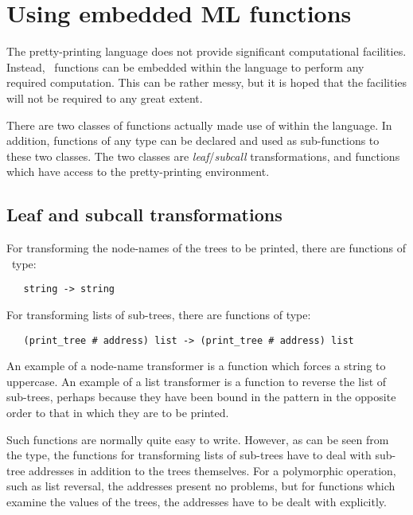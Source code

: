 
\chapter{Using embedded ML functions\label{functions}}

The pretty-printing language does not provide significant computational
facilities. Instead, \ML\ functions can be embedded within the language to
perform any required computation. This can be rather messy, but it is hoped
that the facilities will not be required to any great extent.

There are two classes of functions actually made use of within the language.
In addition, functions of any type can be declared and used as sub-functions to
these two classes. The two classes are {\it leaf}/{\it subcall\/}
transformations, and functions which have access to the pretty-printing
environment.


\section{Leaf and subcall transformations\label{leafandsubtrans}}

For transforming the node-names of the trees to be printed, there are functions
of \ML\ type:

\begin{small}\begin{verbatim}
   string -> string
\end{verbatim}\end{small}

\noindent
For transforming lists of sub-trees, there are functions of type:

\begin{small}\begin{verbatim}
   (print_tree # address) list -> (print_tree # address) list
\end{verbatim}\end{small}

\noindent
An example of a node-name transformer is a function which forces a string to
uppercase. An example of a list transformer is a function to reverse the list
of sub-trees, perhaps because they have been bound in the pattern in the
opposite order to that in which they are to be printed.

Such functions are normally quite easy to write. However, as can be seen from
the type, the functions for transforming lists of sub-trees have to deal with
sub-tree addresses in addition to the trees themselves. For a polymorphic
operation, such as list reversal, the addresses present no problems, but for
functions which examine the values of the trees, the addresses have to be
dealt with explicitly.


